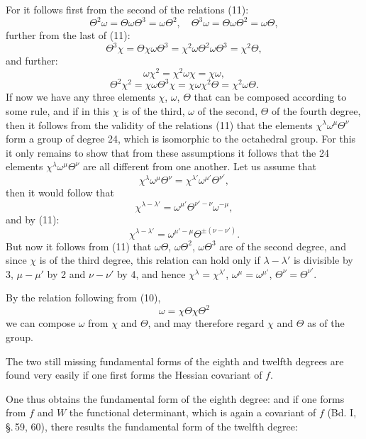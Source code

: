 
For it follows first from the second of the relations (11):
\[
\Theta^2\omega = \Theta\omega\Theta^3 = \omega\Theta^2, \quad \Theta^3\omega = \Theta\omega\Theta^2 = \omega\Theta,
\]
further from the last of (11):
\[
\Theta^3\chi = \Theta\chi\omega\Theta^3 = \chi^2\omega\Theta^2\omega\Theta^3 = \chi^2\Theta,
\]
and further:
\[
\omega\chi^2 = \chi^2\omega\chi = \chi\omega,
\]
\[
\Theta^2\chi^2 = \chi\omega\Theta^3\chi = \chi\omega\chi^2\Theta = \chi^2\omega\Theta.
\]
If now we have any three elements $\chi$, $\omega$, $\Theta$ that can be
composed according to some rule, and if in this $\chi$ is of the
third, $\omega$ of the second, $\Theta$ of the fourth degree, then it follows
from the validity of the relations (11) that the elements
$\chi^{\lambda}\omega^{\mu}\Theta^{\nu}$ form a group of degree 24, which is isomorphic
to the octahedral group. For this it only remains to show
that from these assumptions it follows that the 24 elements
$\chi^{\lambda}\omega^{\mu}\Theta^{\nu}$ are all different from one another. Let us assume
that
\[
\chi^{\lambda}\omega^{\mu}\Theta^{\nu} = \chi^{\lambda'}\omega^{\mu'}\Theta^{\nu'},
\]
then it would follow that
\[
\chi^{\lambda - \lambda'} = \omega^{\mu'}\Theta^{\nu' - \nu}\omega^{-\mu},
\]
and by (11):
\[
\chi^{\lambda - \lambda'} = \omega^{\mu' - \mu}\Theta^{\pm(\nu - \nu')}.
\]
But now it follows from (11) that $\omega\Theta$, $\omega\Theta^2$, $\omega\Theta^3$ are of the
second degree, and since $\chi$ is of the third degree, this relation
can hold only if $\lambda - \lambda'$ is divisible by 3, $\mu - \mu'$ by 2 and
$\nu - \nu'$ by 4, and hence $\chi^{\lambda} = \chi^{\lambda'}$, $\omega^{\mu} = \omega^{\mu'}$, $\Theta^{\nu} = \Theta^{\nu'}$.

By the relation following from (10),
\[
\omega = \chi\Theta\chi\Theta^2
\]
we can compose $\omega$ from $\chi$ and $\Theta$, and may therefore regard $\chi$ and
$\Theta$ as  of the group.

The two still missing fundamental forms of the eighth and twelfth
degrees are found very easily if one first forms the Hessian
covariant of $f$.

One thus obtains the fundamental form of the eighth degree:
and if one forms from $f$ and $W$ the functional determinant,
which is again a covariant of $f$ (Bd. I, \S.\,59, 60), there
results the fundamental form of the twelfth degree:
